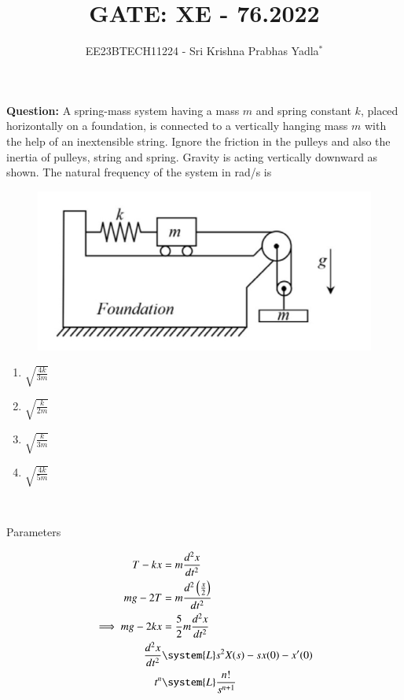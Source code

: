 \documentclass[journal,12pt,twocolumn]{IEEEtran}
\theoremstyle{remark}
\begin{document}

\vspace{3cm}

\title{GATE: XE - 76.2022}
\author{EE23BTECH11224 - Sri Krishna Prabhas Yadla$^{*}$%
}
\maketitle
\newpage
\bigskip

\renewcommand{\thefigure}{\arabic{figure}}
\renewcommand{\thetable}{\arabic{table}}


\vspace{3cm}
\textbf{Question:} A spring-mass system having a mass $m$ and spring constant $k$, placed horizontally on a foundation, is connected to a vertically hanging mass $m$ with the help of an inextensible string. Ignore the friction in the pulleys and also the inertia of pulleys, string and spring. Gravity is acting vertically downward as shown. The natural frequency of the system in rad/s is 
\begin{figure}[htbp]
	\includegraphics[width=\columnwidth]{figs/question_xe76_22.jpg}
	\label{fig:question_xe76_22}
\end{figure}
\begin{enumerate}[label=(\Alph*)]
\item $\sqrt{\frac{4k}{3m}}$
\item $\sqrt{\frac{k}{2m}}$
\item $\sqrt{\frac{k}{3m}}$
\item $\sqrt{\frac{4k}{5m}}$
\end{enumerate}
\\
\solution
\begin{table}[htbp]
	\centering
	\def\arraystretch{1.5}
	
	\caption{Parameters}
	\label{tab:parameters_xe76}
\end{table}
\begin{align}
T-kx &= m\frac{d^2x}{dt^2} \\
mg - 2T &= m\frac{d^2\brak{\frac{x}{2}}}{dt^2} \\
\implies mg - 2kx &= \frac{5}{2}m\frac{d^2x}{dt^2}\\
\label{xe76_L(x'')}\frac{d^2x}{dt^2} &\system{L} s^2X(s)-sx(0)-x'(0) \\
\label{xe76_L(t^n)}t^n &\system{L} \frac{n!}{s^{n+1}}
\end{align}
\end{document}
